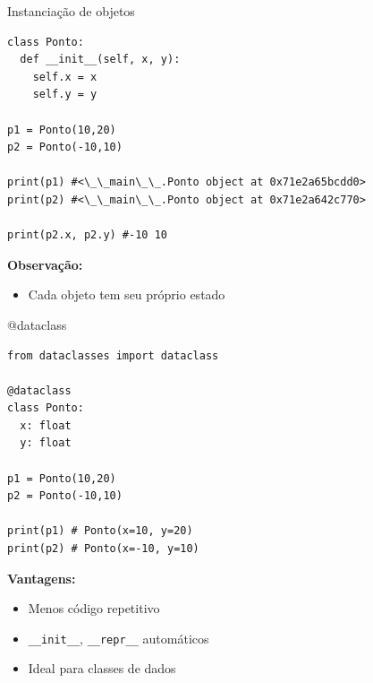 \documentclass{beamer}
\begin{document}
\begin{frame}[fragile]{Instanciação de objetos}
  
  \begin{verbatim}
class Ponto:
  def __init__(self, x, y):
    self.x = x
    self.y = y

p1 = Ponto(10,20)
p2 = Ponto(-10,10) 

print(p1) #<\_\_main\_\_.Ponto object at 0x71e2a65bcdd0>
print(p2) #<\_\_main\_\_.Ponto object at 0x71e2a642c770>

print(p2.x, p2.y) #-10 10
  \end{verbatim}
  
  \vspace{0.3cm}
  
  \textbf{Observação:}
  \begin{itemize}
    \item Cada objeto tem seu próprio estado
  \end{itemize}
  
\end{frame}


\begin{frame}[fragile]{@dataclass}
  
  \begin{verbatim}
from dataclasses import dataclass

@dataclass
class Ponto:
  x: float
  y: float
  
p1 = Ponto(10,20)
p2 = Ponto(-10,10)

print(p1) # Ponto(x=10, y=20)
print(p2) # Ponto(x=-10, y=10)
  \end{verbatim}
  
  \vspace{0.3cm}
  
  \textbf{Vantagens:}
  \begin{itemize}
    \item Menos código repetitivo
    \item \texttt{\_\_init\_\_}, \texttt{\_\_repr\_\_} automáticos
    \item Ideal para classes de dados
  \end{itemize}
  
\end{frame}
\end{document}
